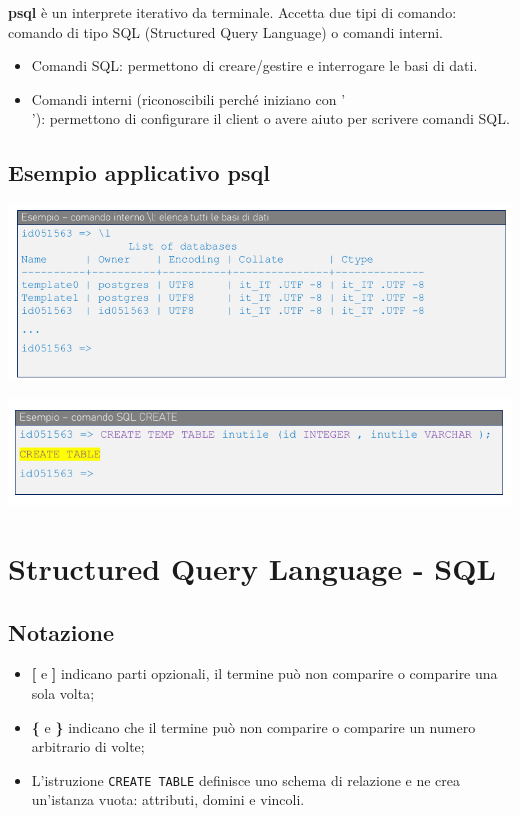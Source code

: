 \documentclass[11pt]{report}
\begin{document}
\textbf{psql} \`e un interprete iterativo da terminale. Accetta due tipi di comando: comando di tipo SQL (Structured Query Language) o comandi interni.
\begin{itemize}
\item Comandi SQL: permettono di creare/gestire e interrogare le basi di dati.
\item Comandi interni (riconoscibili perch\'e iniziano con '\\'): permettono di configurare il client o avere aiuto per scrivere comandi SQL.
\end{itemize}

\section{Esempio applicativo psql}
\begin{center}
\includegraphics[scale=0.5]{applicativo-psql.png}

\includegraphics[scale=0.525]{applicativo-psql-esempio-sql.png}
\end{center}


\chapter{Structured Query Language - SQL}
\section{Notazione}
\begin{itemize}
\item \textbf{[} e \textbf{]} indicano parti opzionali, il termine pu\`o non comparire o comparire una sola volta;
\item \textbf{\{} e \textbf{\}} indicano che il termine pu\`o non comparire o comparire un numero arbitrario di volte;
\item L'istruzione \texttt{CREATE TABLE} definisce uno schema di relazione e ne crea un'istanza vuota: attributi, domini e vincoli.

\end{itemize}
\end{document}

